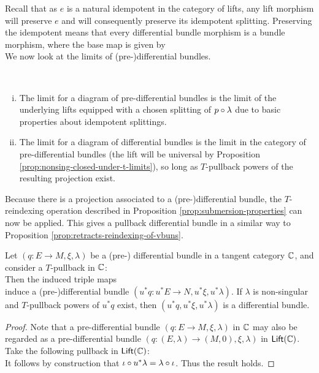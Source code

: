 Recall that as $e$ is a natural idempotent in the category of lifts, any lift morphism will preserve $e$ and will consequently preserve its idempotent splitting. Preserving the idempotent means that every differential bundle morphism is a bundle morphism, where the base map is given by \[\]
We now look at the limits of (pre-)differential bundles.
\begin{observation}%
  \label{obs:T-limits-pdbs}
  ~\begin{enumerate}[(i)]
    \item The limit for a diagram of pre-differential bundles is the limit of the underlying lifts equipped with a chosen splitting of $p \circ \lambda$ due to basic properties about idempotent splittings.
    \item The limit for a diagram of differential bundles is the limit in the category of pre-differential bundles (the lift will be universal by Proposition \ref{prop:nonsing-closed-under-t-limits}), so long as $T$-pullback powers of the resulting projection exist.
  \end{enumerate}
\end{observation}
Because there is a projection associated to a (pre-)differential bundle, the $T$-reindexing operation described in Proposition \ref{prop:submersion-properties} can now be applied. This gives a pullback differential bundle in a similar way to Proposition \ref*{prop:retracts-reindexing-of-vbuns}.
\begin{lemma}%
  \label{lem:reindex-db}
  Let $(q:E \to M, \xi, \lambda)$ be a (pre-) differential bundle in a tangent category $\mathbb{C}$, and consider a $T$-pullback in $\mathbb{C}$:
  \[\]
  Then the induced triple maps
  \[\]
  induce a (pre-)differential bundle $(u^*q: u^*E \to N, u^*\xi, u^*\lambda)$. If $\lambda$ is non-singular and $T$-pullback powers of $u^*q$ exist, then $(u^*q, u^*\xi, u^*\lambda)$ is a differential bundle.
\end{lemma}
\begin{proof}
  Note that a pre-differential bundle $(q:E \to M, \xi, \lambda)$ in $\mathbb{C}$ may also be regarded as a pre-differential bundle $(q: (E,\lambda) \to (M, 0), \xi, \lambda)$ in $\mathsf{Lift}(\mathbb{C})$. Take the following pullback in $\mathsf{Lift}(\mathbb{C})$:
  \[\]
  It follows by construction that $\iota \circ u^*\lambda = \lambda \circ \iota$. Thus the result holds.
\end{proof}

